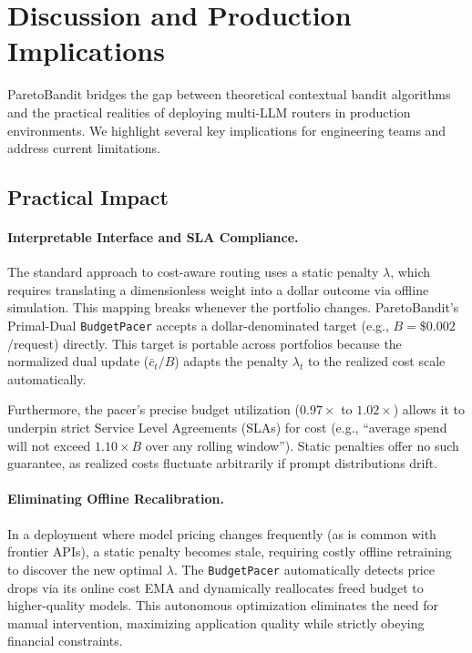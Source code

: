 \section{Discussion and Production Implications}
\label{sec:discussion}

ParetoBandit bridges the gap between theoretical contextual bandit algorithms and the practical realities of deploying multi-LLM routers in production environments. We highlight several key implications for engineering teams and address current limitations.

\subsection{Practical Impact}

\paragraph{Interpretable Interface and SLA Compliance.} 
The standard approach to cost-aware routing uses a static penalty $\lambda$, which requires translating a dimensionless weight into a dollar outcome via offline simulation. This mapping breaks whenever the portfolio changes. ParetoBandit's Primal-Dual \texttt{BudgetPacer} accepts a dollar-denominated target (e.g., $B = \$0.002$/request) directly. This target is portable across portfolios because the normalized dual update ($\bar{c}_t / B$) adapts the penalty $\lambda_t$ to the realized cost scale automatically. 

Furthermore, the pacer's precise budget utilization ($0.97\times$ to $1.02\times$) allows it to underpin strict Service Level Agreements (SLAs) for cost (e.g., ``average spend will not exceed $1.10 \times B$ over any rolling window''). Static penalties offer no such guarantee, as realized costs fluctuate arbitrarily if prompt distributions drift.

\paragraph{Eliminating Offline Recalibration.}
In a deployment where model pricing changes frequently (as is common with frontier APIs), a static penalty becomes stale, requiring costly offline retraining to discover the new optimal $\lambda$. The \texttt{BudgetPacer} automatically detects price drops via its online cost EMA and dynamically reallocates freed budget to higher-quality models. This autonomous optimization eliminates the need for manual intervention, maximizing application quality while strictly obeying financial constraints.

